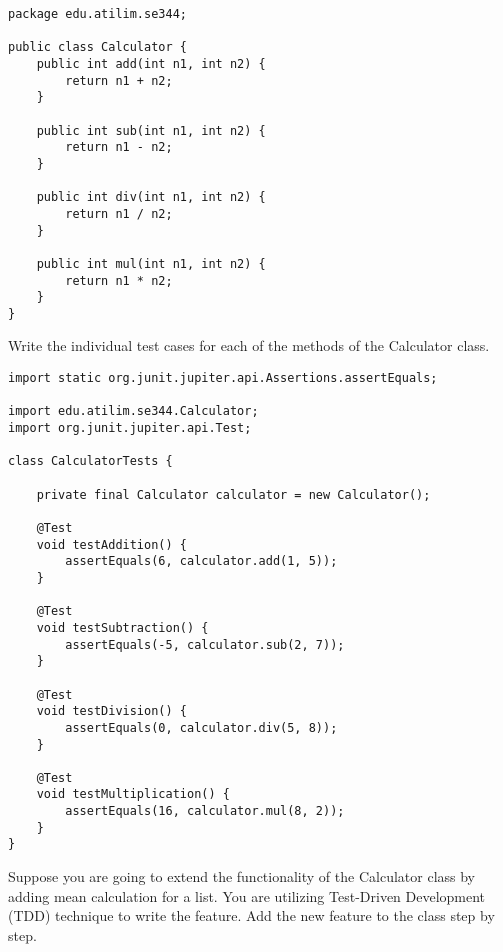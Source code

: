 \begin{lstlisting}[caption={A Calculator class implementation in Java.},label=lst:java-calc]
package edu.atilim.se344;

public class Calculator {
    public int add(int n1, int n2) {
        return n1 + n2;
    }
    
    public int sub(int n1, int n2) {
        return n1 - n2;
    }
    
    public int div(int n1, int n2) {
        return n1 / n2;
    }
    
    public int mul(int n1, int n2) {
        return n1 * n2;
    }
}
\end{lstlisting}

\begin{exercise}
    Write the individual test cases for each of the methods of the Calculator class.
\end{exercise}

\begin{solution}
    \begin{lstlisting}[caption={Trivial unit tests for the Calculator class.}]
import static org.junit.jupiter.api.Assertions.assertEquals;

import edu.atilim.se344.Calculator;
import org.junit.jupiter.api.Test;

class CalculatorTests {

    private final Calculator calculator = new Calculator();

    @Test
    void testAddition() {
        assertEquals(6, calculator.add(1, 5));
    }
    
    @Test
    void testSubtraction() {
        assertEquals(-5, calculator.sub(2, 7));
    }
    
    @Test
    void testDivision() {
        assertEquals(0, calculator.div(5, 8));
    }
    
    @Test
    void testMultiplication() {
        assertEquals(16, calculator.mul(8, 2));
    }
}
    \end{lstlisting}
\end{solution}

\begin{exercise}
    Suppose you are going to extend the functionality of the Calculator class by adding mean calculation for a list. You are utilizing Test-Driven Development (TDD) technique to write the feature. Add the new feature to the class step by step.
\end{exercise}

